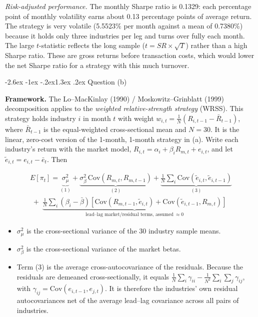 \documentclass[11pt]{article}
\makeatletter
\renewcommand\section{\@startsection{section}{1}{0pt}%
  {-2.6ex \@plus -1ex \@minus -.2ex}{1.3ex \@plus .2ex}%
  {\normalfont\scshape\large\color{psink}}}   %
\makeatother
\begin{document}
\emph{Risk-adjusted performance.} The monthly Sharpe ratio is 0.1329: each percentage point of monthly volatility earns about 0.13 percentage points of average return. The strategy is very volatile (5.5523\% per month against a mean of 0.7380\%) because it holds only three industries per leg and turns over fully each month. The large $t$-statistic reflects the long sample ($t = SR\times\sqrt{T}$) rather than a high Sharpe ratio. These are gross returns before transaction costs, which would lower the net Sharpe ratio for a strategy with this much turnover.
 
\section{Question (b)}
 
\textbf{Framework.} The Lo--MacKinlay (1990) / Moskowitz--Grinblatt (1999) decomposition applies to the \emph{weighted relative-strength strategy} (WRSS). This strategy holds industry $i$ in month $t$ with weight $w_{i,t}=\frac{1}{N}\left(R_{i,t-1}-\bar R_{t-1}\right)$, where $\bar R_{t-1}$ is the equal-weighted cross-sectional mean and $N=30$. It is the linear, zero-cost version of the 1-month, 1-month strategy in (a). Write each industry's return with the market model, $R_{i,t}=\alpha_i+\beta_i R_{m,t}+e_{i,t}$, and let $\tilde e_{i,t}=e_{i,t}-\bar e_t$. Then
 
\begin{multline*}
E[\pi_t]=\underbrace{\sigma^2_\mu}_{(1)}+\underbrace{\sigma^2_\beta\,\mathrm{Cov}(R_{m,t},R_{m,t-1})}_{(2)}+\underbrace{\tfrac{1}{N}\textstyle\sum_i \mathrm{Cov}(\tilde e_{i,t},\tilde e_{i,t-1})}_{(3)} \\
\;+\;\underbrace{\tfrac{1}{N}\textstyle\sum_i(\beta_i-\bar\beta)\left[\mathrm{Cov}(R_{m,t-1},\tilde e_{i,t})+\mathrm{Cov}(\tilde e_{i,t-1},R_{m,t})\right]}_{\text{lead--lag market/residual terms, assumed}\ \approx 0}
\end{multline*}
 
\begin{itemize}
  \item $\sigma^2_\mu$ is the cross-sectional variance of the 30 industry sample means.
  \item $\sigma^2_\beta$ is the cross-sectional variance of the market betas.
  \item Term (3) is the average cross-autocovariance of the residuals. Because the residuals are demeaned cross-sectionally, it equals $\frac{1}{N}\sum_i\gamma_{ii}-\frac{1}{N^2}\sum_i\sum_j\gamma_{ij}$, with $\gamma_{ij}=\mathrm{Cov}(e_{i,t-1},e_{j,t})$. It is therefore the industries' own residual autocovariances net of the average lead--lag covariance across all pairs of industries.
\end{itemize}
 
\end{document}
